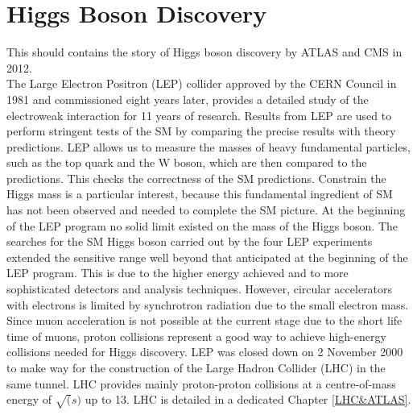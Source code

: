 \section{Higgs Boson Discovery}
\label{chap1:H2012}
This should contains the story of Higgs boson discovery by ATLAS and CMS in 2012. \\
The Large Electron Positron (LEP) collider approved by the CERN Council in 1981 and commissioned eight years later, provides a detailed study of the electroweak interaction for 11 years of research. Results from LEP are used to perform stringent tests of the SM by comparing the precise results with theory predictions. LEP allows us to measure the masses of heavy fundamental particles, such as the top quark and the W boson, which are then compared to the predictions. This checks the correctness of the SM predictions. Constrain the Higgs mass is a particular interest, because this fundamental ingredient of SM has not been observed and needed to complete the SM picture. At the beginning of the LEP program no solid limit existed on the mass of the Higgs boson. The searches for the SM Higgs boson carried out by the four LEP experiments extended the sensitive range well beyond that anticipated at the beginning of the LEP program. This is due to the higher energy achieved and to more sophisticated detectors and analysis techniques. However, circular accelerators with electrons is limited by synchrotron radiation due to the small electron mass. Since muon acceleration is not possible at the current stage due to the short life time of muons, proton collisions represent a good way to achieve high-energy collisions needed for Higgs discovery. LEP was closed down on 2 November 2000 to make way for the construction of the Large Hadron Collider (LHC) in the same tunnel. LHC provides mainly proton-proton collisions at a centre-of-mass energy of $\sqrt(s)$ up to 13. LHC is detailed in a dedicated Chapter \ref{LHC&ATLAS}. 
